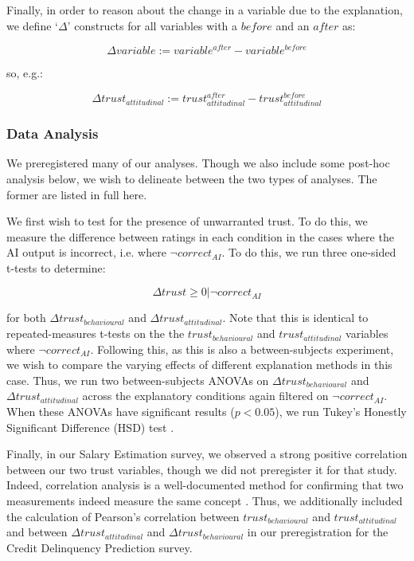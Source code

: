 Finally, in order to reason about the change in a variable due to the explanation, we define `$\Delta$' constructs for all variables with a $before$ and an $after$ as:

\begin{equation}
    \Delta variable := variable^{after} - variable^{before}
\end{equation}

\noindent so, e.g.:

\begin{equation}
    \Delta trust_{attitudinal} := trust_{attitudinal}^{after} - trust_{attitudinal}^{before}
\end{equation}

\subsubsection{Data Analysis}
We preregistered many of our analyses. Though we also include some post-hoc analysis below, we wish to delineate between the two types of analyses. The former are listed in full here.

We first wish to test for the presence of unwarranted trust. To do this, we measure the difference between ratings in each condition in the cases where the AI output is incorrect, i.e. where $\neg correct_{AI}$. To do this, we run three one-sided t-tests \cite{caldwell_power_nodate} to determine:

\begin{equation}
    \Delta trust \geq 0 | \neg correct_{AI}
\end{equation}

\noindent for both $\Delta trust_{behavioural}$ and $\Delta trust_{attitudinal}$. Note that this is identical to repeated-measures t-tests on the the $trust_{behavioural}$ and $trust_{attitudinal}$ variables where $\neg correct_{AI}$. Following this, as this is also a between-subjects experiment, we wish to compare the varying effects of different explanation methods in this case. Thus, we run two between-subjects ANOVAs \cite{caldwell_power_nodate} on $\Delta trust_{behavioural}$ and $\Delta trust_{attitudinal}$ across the explanatory conditions again filtered on $\neg correct_{AI}$. When these ANOVAs have significant results ($p < 0.05$), we run Tukey's Honestly Significant Difference (HSD) test \cite{caldwell_power_nodate}.

Finally, in our Salary Estimation survey, we observed a strong positive correlation between our two trust variables, though we did not preregister it for that study. Indeed, correlation analysis is a well-documented method for confirming that two measurements indeed measure the same concept \cite{westen_quantifying_2003, morata-ramirez_construct_2013}. Thus, we additionally included the calculation of Pearson's correlation between $trust_{behavioural}$ and $trust_{attitudinal}$ and between $\Delta trust_{attitudinal}$ and $\Delta trust_{behavioural}$ in our preregistration for the Credit Delinquency Prediction survey. 

